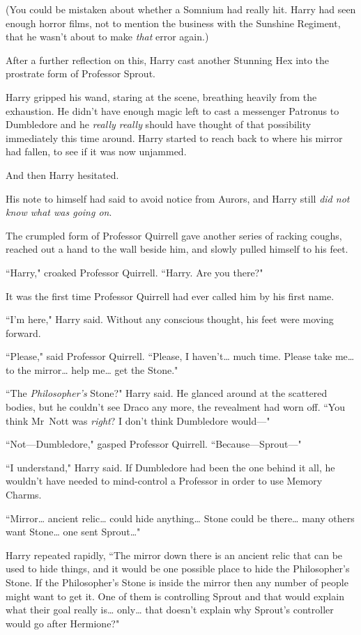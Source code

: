 (You could be mistaken about whether a Somnium had really hit. Harry had seen enough horror films, not to mention the business with the Sunshine Regiment, that he wasn't about to make \emph{that} error again.)

After a further reflection on this, Harry cast another Stunning Hex into the prostrate form of Professor Sprout.

Harry gripped his wand, staring at the scene, breathing heavily from the exhaustion. He didn't have enough magic left to cast a messenger Patronus to Dumbledore and he \emph{really really} should have thought of that possibility immediately this time around. Harry started to reach back to where his mirror had fallen, to see if it was now unjammed.

And then Harry hesitated.

His note to himself had said to avoid notice from Aurors, and Harry still \emph{did not know what was going on}.

The crumpled form of Professor Quirrell gave another series of racking coughs, reached out a hand to the wall beside him, and slowly pulled himself to his feet.

``Harry," croaked Professor Quirrell. ``Harry. Are you there?"

It was the first time Professor Quirrell had ever called him by his first name.

``I'm here," Harry said. Without any conscious thought, his feet were moving forward.

``Please," said Professor Quirrell. ``Please, I haven't{\ldots} much time. Please take me{\ldots} to the mirror{\ldots} help me{\ldots} get the Stone."

``The \emph{Philosopher's} Stone?" Harry said. He glanced around at the scattered bodies, but he couldn't see Draco any more, the revealment had worn off. ``You think Mr~Nott was \emph{right}? I don't think Dumbledore would—"

``Not—Dumbledore," gasped Professor Quirrell. ``Because—Sprout—"

``I understand," Harry said. If Dumbledore had been the one behind it all, he wouldn't have needed to mind-control a Professor in order to use Memory Charms.

``Mirror{\ldots} ancient relic{\ldots} could hide anything{\ldots} Stone could be there{\ldots} many others want Stone{\ldots} one sent Sprout{\ldots}"

Harry repeated rapidly, ``The mirror down there is an ancient relic that can be used to hide things, and it would be one possible place to hide the Philosopher's Stone. If the Philosopher's Stone is inside the mirror then any number of people might want to get it. One of them is controlling Sprout and that would explain what their goal really is{\ldots} only{\ldots} that doesn't explain why Sprout's controller would go after Hermione?"

